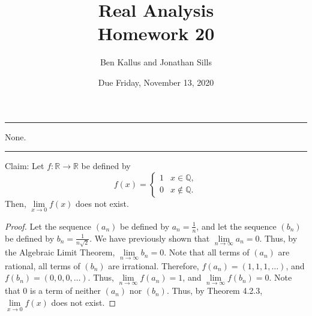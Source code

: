 \documentclass[12pt]{article}
\title{Real Analysis \\ Homework 20}
\author{Ben Kallus and Jonathan Sills}
\date{Due Friday, November 13, 2020}
\begin{document}
\pagecolor{black}
\color{white}
\maketitle

\hrule
\bigskip

 None.

\bigskip
\hrule
\bigskip

 Claim: Let $f: \mathbb R \to \mathbb R$ be defined by \[f(x) = \begin{cases} 1 & x \in \mathbb Q, \\ 0 & x \notin \mathbb Q. \end{cases}\] Then, $\lim\limits_{x \to 0}f(x)$ does not exist.
\begin{proof}
    Let the sequence $(a_n)$ be defined by $a_n = \frac1n$, and let the sequence $(b_n)$ be defined by $b_n = \frac1{n\sqrt2}$.
    We have previously shown that $\lim\limits_{n\to\infty} a_n = 0$.
    Thus, by the Algebraic Limit Theorem, $\lim\limits_{n\to\infty} b_n = 0$.
    Note that all terms of $(a_n)$ are rational, all terms of $(b_n)$ are irrational.
    Therefore, $f(a_n) = (1, 1, 1, \hdots)$, and $f(b_n) = (0, 0, 0, \hdots)$.
    Thus, $\lim\limits_{n\to\infty} f(a_n) = 1$, and $\lim\limits_{n\to\infty} f(b_n) = 0$.
    Note that 0 is a term of neither $(a_n)$ nor $(b_n)$.
    Thus, by Theorem 4.2.3, $\lim\limits_{x\to0}f(x)$ does not exist.
\end{proof}
\end{document}
